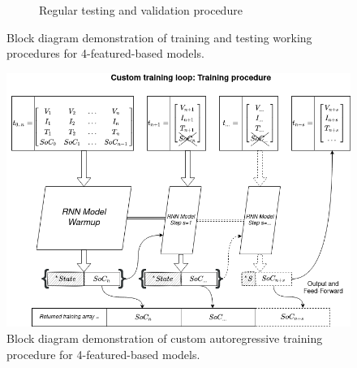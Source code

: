 {\begin{figure}[htbp]
\begin{subfigure}[b]{0.85\textwidth}
            \caption{Regular testing and validation procedure}
            \label{subfig:testing}
        \end{subfigure}
        \caption{Block diagram demonstration of training and testing working procedures for 4-featured-based models.}
        \label{fig:training_testing}
    \end{figure}
} {
    \begin{figure}[!t]
        \centering
        \includegraphics[width=0.85\linewidth]{II_Body/images/Autoregression-Training.png}
        \caption{Block diagram demonstration of custom autoregressive training procedure for 4-featured-based models.}
        \label{fig:training_testing}
    \end{figure}
}


